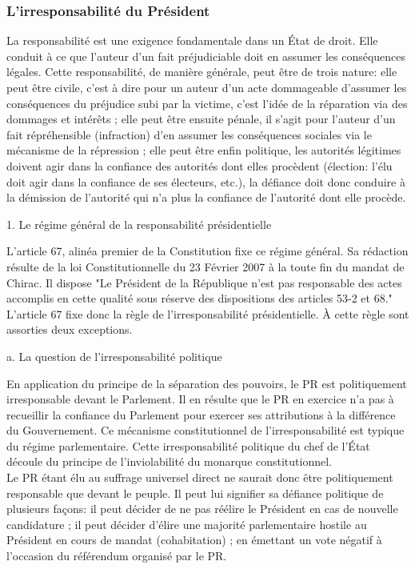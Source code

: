 \documentclass[12pt, a4paper, openany]{book}
\begin{document}
\subsubsection{L'irresponsabilité du Président}

La responsabilité est une exigence fondamentale dans un État de droit. Elle conduit à ce que l'auteur d'un fait préjudiciable doit en assumer les conséquences légales. Cette responsabilité, de manière générale, peut être de trois nature: elle peut être civile, c'est à dire pour un auteur d'un acte dommageable d'assumer les conséquences du préjudice subi par la victime, c'est l'idée de la réparation via des dommages et intérêts ; elle peut être ensuite pénale, il s'agit pour l'auteur d'un fait répréhensible (infraction) d'en assumer les conséquences sociales via le mécanisme de la répression ; elle peut être enfin politique, les autorités légitimes doivent agir dans la confiance des autorités dont elles procèdent (élection: l'élu doit agir dans la confiance de ses électeurs, etc.), la défiance doit donc conduire à la démission de l'autorité qui n'a plus la confiance de l'autorité dont elle procède.


1. Le régime général de la responsabilité présidentielle


L'article 67, alinéa premier de la Constitution fixe ce régime général. Sa rédaction résulte de la loi Constitutionnelle du 23 Février 2007 à la toute fin du mandat de Chirac. Il dispose "Le Président de la République n'est pas responsable des actes accomplis en cette qualité sous réserve des dispositions des articles 53-2 et 68." \\
L'article 67 fixe donc la règle de l'irresponsabilité présidentielle. À cette règle sont assorties deux exceptions.


a. La question de l'irresponsabilité politique


En application du principe de la séparation des pouvoirs, le PR est politiquement irresponsable devant le Parlement. Il en résulte que le PR en exercice n'a pas à recueillir la confiance du Parlement pour exercer ses attributions à la différence du Gouvernement. Ce mécanisme constitutionnel de l'irresponsabilité est typique du régime parlementaire. Cette irresponsabilité politique du chef de l'État découle du principe de l'inviolabilité du monarque constitutionnel. \\
Le PR étant élu au suffrage universel direct ne saurait donc être politiquement responsable que devant le peuple. Il peut lui signifier sa défiance politique de plusieurs façons: il peut décider de ne pas réélire le Président en cas de nouvelle candidature ; il peut décider d'élire une majorité parlementaire hostile au Président en cours de mandat (cohabitation) ; en émettant un vote négatif à l'occasion du référendum organisé par le PR.
\end{document}
